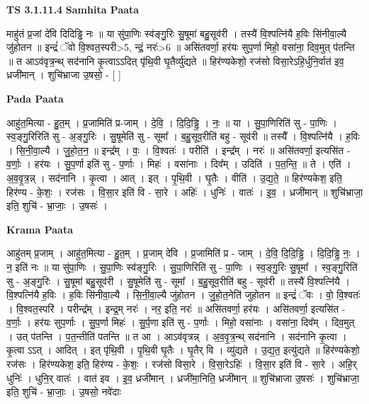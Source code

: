 \documentclass[17pt]{extarticle}
\begin{document}
\textbf{TS 3.1.11.4 } \newline
\textbf{Samhita Paata} \newline

माहु॑तं प्र॒जां दे॑वि दिदिड्ढि नः ॥ या सु॑पा॒णिः स्व॑ङ्गु॒रिः सु॒षूमा॑ बहु॒सूव॑री । तस्यै॑ वि॒श्पत्नि॑यै ह॒विः सि॑नीवा॒ल्यै जु॑होतन ॥ इन्द्रं॑ ॅवो वि॒श्वत॒स्परी>5, न्द्रं॒ नरः॑>6 ॥ असि॑तवर्णा॒ हर॑यः सुप॒र्णा मिहो॒ वसा॑ना॒ दिव॒मुत् प॑तन्ति ॥ त आऽव॑वृत्र॒न्थ् सद॑नानि कृ॒त्वाऽऽदित् पृ॑थि॒वी घृ॒तैर्व्यु॑द्यते ॥ हिर॑ण्यकेशो॒ रज॑सो विसा॒रेऽहि॒र्धुनि॒र्वात॑ इव॒ ध्रजी॑मान् । शुचि॑भ्राजा उ॒षसो॒ - [  ] \newline

\textbf{Pada Paata} \newline

आहु॑त॒मित्या - हु॒त॒म् । प्र॒जामिति॑ प्र-जाम् । दे॒वि॒ । दि॒दि॒ड्ढि॒ । नः॒ ॥ या । सु॒पा॒णिरिति॑ सु - पा॒णिः । स्व॒ङ्गु॒रिरिति॑ सु - अ॒ङ्गु॒रिः । सु॒षूमेति॑ सु - सूमा᳚ । ब॒हु॒सूव॒रीति॑ बहु - सूव॑री ॥ तस्यै᳚ । वि॒श्पत्नि॑यै । ह॒विः । सि॒नी॒वा॒ल्यै । जु॒हो॒त॒न॒ ॥ इन्द्र᳚म् । वः॒ । वि॒श्वतः॑ । परीति॑ । इन्द्र᳚म् । नरः॑ ॥ असि॑तवर्णा॒ इत्यसि॑त - व॒र्णाः॒ । हर॑यः । सु॒प॒र्णा इति॑ सु - प॒र्णाः । मिहः॑ । वसा॑नाः । दिव᳚म् । उदिति॑ । प॒त॒न्ति॒ ॥ ते । एति॑ । अ॒व॒वृ॒त्र॒न्न् । सद॑नानि । कृ॒त्वा । आत् । इत् । पृ॒थि॒वी । घृ॒तैः । वीति॑ । उ॒द्य॒ते॒ ॥ हिर॑ण्यकेश॒ इति॒ हिर॑ण्य - के॒शः॒ । रज॑सः । वि॒सा॒र इति॑ वि - सा॒रे । अहिः॑ । धुनिः॑ । वातः॑ । इ॒व॒ । ध्रजी॑मान् ॥ शुचि॑भ्राजा॒ इति॒ शुचि॑ - भ्रा॒जाः॒ । उ॒षसः॑ ।  \newline


\textbf{Krama Paata} \newline

आहु॑तम् प्र॒जाम् । आहु॑त॒मित्या - हु॒त॒म् । प्र॒जाम् दे॑वि । प्र॒जामिति॑ प्र - जाम् । दे॒वि॒ दि॒दि॒ड्ढि॒ । दि॒दि॒ड्ढि॒ नः॒ । न॒ इति॑ नः ॥ या सु॑पा॒णिः । सु॒पा॒णिः स्व॑ङ्गु॒रिः । सु॒पा॒णिरिति॑ सु - पा॒णिः । स्व॒ङ्गु॒रिः सु॒षूमा᳚ । स्व॒ङ्गु॒रिति॑ सु - अ॒ङ्गु॒रिः । सु॒षूमा॑ बहु॒सूव॑री । सु॒षूमेति॑ सु - सूमा᳚ । ब॒॒हु॒सूव॒रीति॑ बहु - सूव॑री ॥ तस्यै॑ वि॒श्पत्नि॑यै । वि॒श्पत्नि॑यै ह॒विः । ह॒विः सि॑नीवा॒ल्यै । सि॒नी॒वा॒ल्यै जु॑होतन । जु॒हो॒त॒नेति॑ जुहोतन ॥ इन्द्रं॑ ॅवः । वो॒ वि॒श्वतः॑ । वि॒श्वत॒स्परि॑ । परीन्द्र᳚म् । इन्द्र॒म् नरः॑ । नर॒ इति॒ नरः॑ ॥ असि॑तवर्णा॒ हर॑यः । असि॑तवर्णा॒ इत्यसि॑त - व॒र्णाः॒ । हर॑यः सुप॒र्णाः । सु॒प॒र्णा मिहः॑ । सु॒र्प॒णा इति॑ सु - प॒र्णाः । मिहो॒ वसा॑नाः । वसा॑ना॒ दिव᳚म् । दिव॒मुत् । उत् प॑तन्ति । प॒त॒न्तीति॑ पतन्ति ॥ त आ । आऽव॑वृत्रन्न् । अ॒व॒वृ॒त्र॒न्थ् सद॑नानि । सद॑नानि कृ॒त्वा । कृ॒त्वा ऽऽत् । आदित् । इत् पृ॑थि॒वी । पृ॒थि॒वी घृ॒तैः । घृ॒तैर् वि । व्यु॑द्यते । उ॒द्य॒त॒ इत्यु॑द्यते ॥ हिर॑ण्यकेशो॒ रज॑सः । हिर॑ण्यकेश॒ इति॒ हिर॑ण्य - के॒शः॒ । रज॑सो विसा॒रे । वि॒सा॒रेऽहिः॑ । वि॒सा॒र इति॑ वि - सा॒रे । अहि॒र् धुनिः॑ । धुनि॒र् वातः॑ । वात॑ इव । इ॒व॒ ध्रजी॑मान् । ध्रजी॑मा॒निति॒ ध्रजी॑मान् ॥ शुचि॑भ्राजा उ॒षसः॑ । शुचि॑भ्राजा॒ इति॒ शुचि॑ - भ्रा॒जाः॒ । उ॒षसो॒ नवे॑दाः \newline
\end{document}

